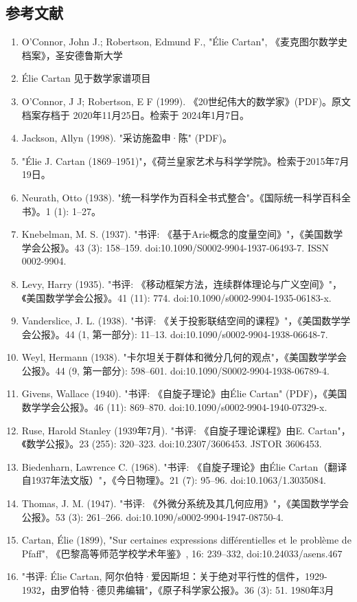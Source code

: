 \subsection{参考文献}  
\begin{enumerate}
\item O'Connor, John J.; Robertson, Edmund F., "Élie Cartan", 《麦克图尔数学史档案》，圣安德鲁斯大学  
\item Élie Cartan 见于数学家谱项目  
\item O'Connor, J J; Robertson, E F (1999). 《20世纪伟大的数学家》(PDF)。原文档案存档于 2020年11月25日。检索于 2024年1月7日。  
\item Jackson, Allyn (1998). "采访施盈申·陈" (PDF)。  
\item "Élie J. Cartan (1869–1951)"，《荷兰皇家艺术与科学学院》。检索于2015年7月19日。  
\item Neurath, Otto (1938). "统一科学作为百科全书式整合"。《国际统一科学百科全书》。1 (1): 1–27。  
\item Knebelman, M. S. (1937). "书评: 《基于Arie概念的度量空间》"，《美国数学学会公报》。43 (3): 158–159. doi:10.1090/S0002-9904-1937-06493-7. ISSN 0002-9904.  
\item Levy, Harry (1935). "书评: 《移动框架方法，连续群体理论与广义空间》"，《美国数学学会公报》。41 (11): 774. doi:10.1090/s0002-9904-1935-06183-x.  
\item Vanderslice, J. L. (1938). "书评: 《关于投影联结空间的课程》"，《美国数学学会公报》。44 (1, 第一部分): 11–13. doi:10.1090/s0002-9904-1938-06648-7.  
\item Weyl, Hermann (1938). "卡尔坦关于群体和微分几何的观点"，《美国数学学会公报》。44 (9, 第一部分): 598–601. doi:10.1090/S0002-9904-1938-06789-4.  
\item Givens, Wallace (1940). "书评: 《自旋子理论》由Élie Cartan" (PDF)，《美国数学学会公报》。46 (11): 869–870. doi:10.1090/s0002-9904-1940-07329-x.  
\item Ruse, Harold Stanley (1939年7月). "书评: 《自旋子理论课程》由E. Cartan"，《数学公报》。23 (255): 320–323. doi:10.2307/3606453. JSTOR 3606453.  
\item Biedenharn, Lawrence C. (1968). "书评: 《自旋子理论》由Élie Cartan（翻译自1937年法文版）"，《今日物理》。21 (7): 95–96. doi:10.1063/1.3035084.  
\item Thomas, J. M. (1947). "书评: 《外微分系统及其几何应用》"，《美国数学学会公报》。53 (3): 261–266. doi:10.1090/s0002-9904-1947-08750-4.  
\item Cartan, Élie (1899), "Sur certaines expressions différentielles et le problème de Pfaff", 《巴黎高等师范学校学术年鉴》, 16: 239–332, doi:10.24033/asens.467  
\item "书评: Élie Cartan, 阿尔伯特·爱因斯坦：关于绝对平行性的信件，1929-1932，由罗伯特·德贝弗编辑"，《原子科学家公报》。36 (3): 51. 1980年3月
\end{enumerate}
